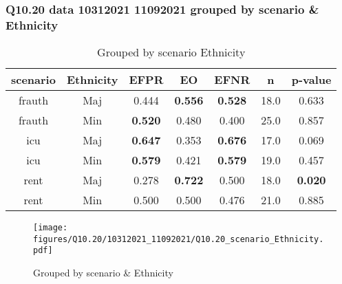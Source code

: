\subsubsection{Q10.20 data 10312021 11092021 grouped by scenario \& Ethnicity}

\begin{comment}
                   EFPR        EO      EFNR     n    pvalue
(frauth, Maj)  0.444444  0.555556  0.527778  18.0  0.633124
(frauth, Min)  0.520000  0.480000  0.400000  25.0  0.857193
(icu, Maj)     0.647059  0.352941  0.676471  17.0  0.069154
(icu, Min)     0.578947  0.421053  0.578947  19.0  0.457470
(rent, Maj)    0.277778  0.722222  0.500000  18.0  0.019675
(rent, Min)    0.500000  0.500000  0.476190  21.0  0.885234
\end{comment}

\begin{table}[h]
    \centering
    \begin{tabular}{|c|c|c|c|c|c|c|}
        \hline
        scenario & Ethnicity & EFPR & EO & EFNR & n & p-value\\
        \hline
        frauth & Maj & 0.444 & \textbf{0.556} & \textbf{0.528} & 18.0 & 0.633\\
		frauth & Min & \textbf{0.520} & 0.480 & 0.400 & 25.0 & 0.857\\
		icu & Maj & \textbf{0.647} & 0.353 & \textbf{0.676} & 17.0 & 0.069\\
		icu & Min & \textbf{0.579} & 0.421 & \textbf{0.579} & 19.0 & 0.457\\
		rent & Maj & 0.278 & \textbf{0.722} & 0.500 & 18.0 & \textbf{0.020}\\
		rent & Min & 0.500 & 0.500 & 0.476 & 21.0 & 0.885\\
		
        \hline
    \end{tabular}
    \caption{Grouped by scenario Ethnicity}
    \label{tab:my_label}
\end{table}
\begin{figure}[h]
    \centering
    \texttt{[image: figures/Q10.20/10312021\_11092021/Q10.20\_scenario\_Ethnicity.pdf]}
    \caption{Grouped by scenario \& Ethnicity}
    \label{fig:my_label}
\end{figure}
